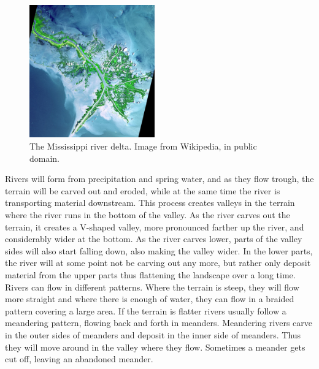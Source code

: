 \documentclass[a4paper,12pt]{report}
\begin{document}
\begin{figure}
  \begin{center}
   \vspace{-25pt}
    \includegraphics[width=0.48\textwidth]{thesis/geo/miss.jpg}
  \end{center}
   \vspace{-15pt}
  \caption{The Mississippi river delta. Image from Wikipedia, in public domain.}
   \vspace{-20pt}
  \label{fig:miss}
\end{figure}
Rivers will form from precipitation and spring water, and as they flow trough, the terrain will be carved out and eroded, while at the same time the river is transporting material downstream. This process creates valleys in the terrain where the river runs in the bottom of the valley. As the river carves out the terrain, it creates a V-shaped valley, more pronounced farther up the river, and considerably wider at the bottom. As the river carves lower, parts of the valley sides will also start falling down, also making the valley wider. In the lower parts, the river will at some point not be carving out any more, but rather only deposit material from the upper parts thus flattening the landscape over a long time. Rivers can flow in different patterns.
Where the terrain is steep, they will flow more straight and where there is enough of water, they can flow in a braided pattern covering a large area. If the terrain is flatter rivers usually follow a meandering pattern, flowing back and forth in meanders. Meandering rivers carve in the outer sides of meanders and deposit in the inner side of meanders. Thus they will move around in the valley where they flow. Sometimes a meander gets cut off, leaving an abandoned meander. 
\end{document}
